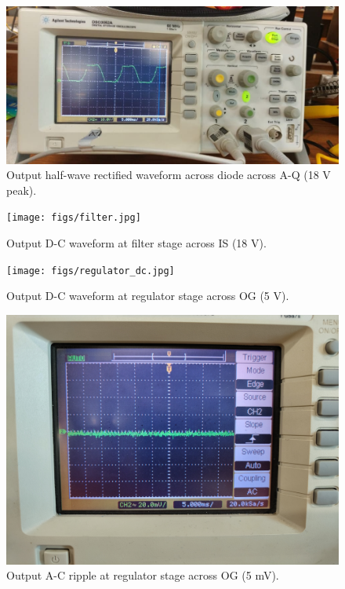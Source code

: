 \documentclass[journal,12pt,twocolumn]{IEEEtran}
\begin{document}
\begin{figure}[!ht]
    \includegraphics[width=\columnwidth]{figs/rectifier.jpg}
    \caption{Output half-wave rectified waveform across diode across A-Q (18 V peak).}
    \label{fig:rectifier}
\end{figure}

\begin{figure}[!ht]
    \texttt{[image: figs/filter.jpg]}
    \caption{Output D-C waveform at filter stage across IS (18 V).}
    \label{fig:filter}
\end{figure}

\begin{figure}[!ht]
    \texttt{[image: figs/regulator\_dc.jpg]}
    \caption{Output D-C waveform at regulator stage across OG (5 V).}
    \label{fig:regulator_dc}
\end{figure}

\begin{figure}[!ht]
    \includegraphics[width=\columnwidth]{figs/regulator_ac.jpg}
    \caption{Output A-C ripple at regulator stage across OG (5 mV).}
    \label{fig:regulator_ac}
\end{figure}
\end{document}
